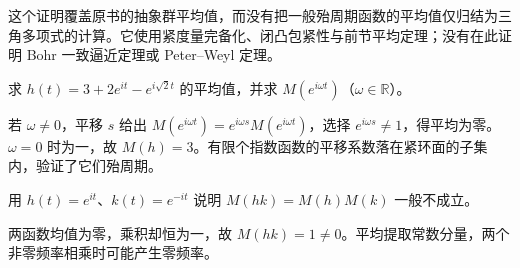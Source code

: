 这个证明覆盖原书的抽象群平均值，而没有把一般殆周期函数的平均值仅归结为三角多项式的计算。它使用紧度量完备化、闭凸包紧性与前节平均定理；没有在此证明 Bohr 一致逼近定理或 Peter--Weyl 定理。

\begin{exercise}[频率与平均]\label{ex:y8-ap-frequency}
求 $h(t)=3+2e^{it}-e^{i\sqrt2t}$ 的平均值，并求 $M(e^{i\omega t})$（$\omega\in\mathbb R$）。
\end{exercise}
\begin{solution}
若 $\omega\ne0$，平移 $s$ 给出 $M(e^{i\omega t})=e^{i\omega s}M(e^{i\omega t})$，选择 $e^{i\omega s}\ne1$，得平均为零。$\omega=0$ 时为一，故 $M(h)=3$。有限个指数函数的平移系数落在紧环面的子集内，验证了它们殆周期。
\end{solution}

\begin{exercise}[平均值不是乘法泛函]\label{ex:y8-ap-product}
用 $h(t)=e^{it}$、$k(t)=e^{-it}$ 说明 $M(hk)=M(h)M(k)$ 一般不成立。
\end{exercise}
\begin{solution}
两函数均值为零，乘积却恒为一，故 $M(hk)=1\ne0$。平均提取常数分量，两个非零频率相乘时可能产生零频率。
\end{solution}
